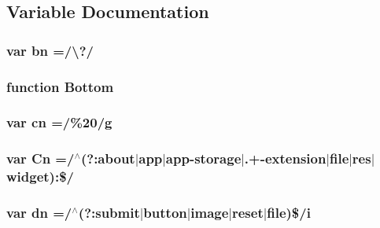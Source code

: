 \subsection{Variable Documentation}
\hypertarget{jquery-1_810_82_8min_8js_ac1a6899002e156376de301d5f5fa36d8}{
\subsubsection[{bn}]{\setlength{\rightskip}{0pt plus 5cm}var bn =/\textbackslash{}?/}}\label{jquery-1_810_82_8min_8js_ac1a6899002e156376de301d5f5fa36d8}
\hypertarget{jquery-1_810_82_8min_8js_aff76c1cba4a00c678dfce0e0c5a5538a}{
\subsubsection[{Bottom}]{\setlength{\rightskip}{0pt plus 5cm}function Bottom}}\label{jquery-1_810_82_8min_8js_aff76c1cba4a00c678dfce0e0c5a5538a}
\hypertarget{jquery-1_810_82_8min_8js_a43c2bda2537661fb64e62fdfdcea1560}{
\subsubsection[{cn}]{\setlength{\rightskip}{0pt plus 5cm}var cn =/\%20/g}}\label{jquery-1_810_82_8min_8js_a43c2bda2537661fb64e62fdfdcea1560}
\hypertarget{jquery-1_810_82_8min_8js_ab832fcb3f80f807f0b65d1e3b4904de8}{
\subsubsection[{Cn}]{\setlength{\rightskip}{0pt plus 5cm}var Cn =/$^\wedge$(?\-:about$\vert$app$\vert$app-\/storage$\vert$.+-\/extension$\vert$file$\vert$res$\vert$widget)\-:\$/}}\label{jquery-1_810_82_8min_8js_ab832fcb3f80f807f0b65d1e3b4904de8}
\hypertarget{jquery-1_810_82_8min_8js_ab5e3f3e2b2507b73e2d8092caa5c8650}{
\subsubsection[{dn}]{\setlength{\rightskip}{0pt plus 5cm}var dn =/$^\wedge$(?\-:{\bf submit}$\vert${\bf button}$\vert$image$\vert$reset$\vert$file)\$/i}}\label{jquery-1_810_82_8min_8js_ab5e3f3e2b2507b73e2d8092caa5c8650}

